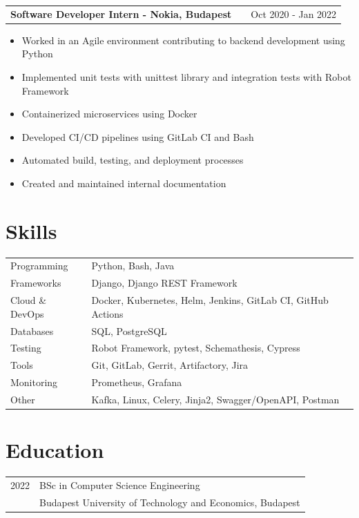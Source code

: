 \documentclass[a4paper,12pt]{article}
\makeatletter
\newenvironment{joblong}[2]
    {
    \begin{tabularx}{\linewidth}{@{}l X r@{}}
    \textbf{#1} & \hfill &  #2 \\[3.75pt]
    \end{tabularx}
    \begin{minipage}[t]{\linewidth}
    \begin{itemize}[nosep,after=\strut, leftmargin=1em, itemsep=3pt,label=--]
    }
    {
    \end{itemize}
    \end{minipage}    
    }
\makeatother
\begin{document}
\begin{joblong}{Software Developer Intern - Nokia, Budapest}{Oct 2020 - Jan 2022}
\item Worked in an Agile environment contributing to backend development using Python
\item Implemented unit tests with unittest library and integration tests with Robot Framework
\item Containerized microservices using Docker
\item Developed CI/CD pipelines using GitLab CI and Bash
\item Automated build, testing, and deployment processes
\item Created and maintained internal documentation
\end{joblong}


\section{Skills}

\begin{tabularx}{\linewidth}{@{}l X@{}}
Programming & Python, Bash, Java \\

Frameworks & Django, Django REST Framework \\

Cloud \& DevOps & Docker, Kubernetes, Helm, Jenkins, GitLab CI, GitHub Actions \\

Databases & SQL, PostgreSQL \\

Testing & Robot Framework, pytest, Schemathesis, Cypress \\

Tools & Git, GitLab, Gerrit, Artifactory, Jira \\

Monitoring & Prometheus, Grafana \\

Other & Kafka, Linux, Celery, Jinja2, Swagger/OpenAPI, Postman \\
\end{tabularx}


\section{Education}

\begin{tabularx}{\linewidth}{@{}l X@{}}
2022 & BSc in Computer Science Engineering \\ 
& Budapest University of Technology and Economics, Budapest \\
\end{tabularx}
\end{document}
